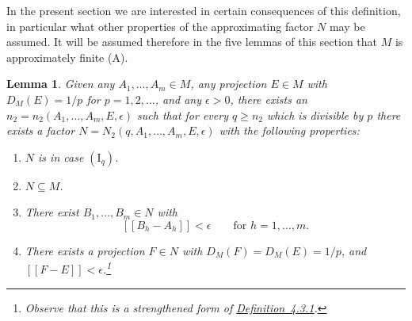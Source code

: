 \documentclass[b5paper,twoside]{article}
\newcommand{\defref}[2]{\hyperref[#1]{\mbox{Definition~#2}}}
\theoremstyle{mvnplain}
\newtheorem{lemma}{Lemma}[section]
\newcommand{\M}{\mathbf M}
\newcommand{\N}{\mathbf N}
\newcommand{\Metric}[1]{\left[\!\left[#1\right]\!\right]}
\def\M{M}%
\def\N{N}%
\def\Metric#1{[[#1]]}%
\begin{document}
In the present section we are interested in certain consequences of this
definition, in particular what other properties of the approximating factor
\(\N\) may be assumed. It will be assumed therefore in the five lemmas of
this section that \(\M\) is approximately finite (A).

\begin{lemma}\label{lem:4.3.1}
Given any \(A_1,\ldots,A_m\in\M\), any projection \(E\in\M\) with
\(D_{\M}(E)=1/p\) for \(p=1,2,\ldots\), and any \(\epsilon>0\), there
exists an \(n_2=n_2(A_1,\ldots,A_m,E,\epsilon)\) such that for every
\(q\ge n_2\) which is divisible by \(p\) there exists a factor
\(\N=\N_2(q,A_1,\ldots,A_m,E,\epsilon)\) with the following properties:
\begin{enumerate}[label=\((\roman*)\)]
\item \(\N\) is in case \((\mathrm I_q)\).
\item \(\N\subseteq\M\).
\item There exist \(B_1,\ldots,B_m\in\N\) with
\[
  \Metric{B_h-A_h}<\epsilon\qquad\text{for }h=1,\ldots,m.
\]
\item There exists a projection \(F\in\N\) with
\(D_{\M}(F)=D_{\M}(E)=1/p\), and
\(\Metric{F-E}<\epsilon\).\footnote{\hypertarget{fn:33}{}Observe that this is a
strengthened form of \defref{def:4.3.1}{4.3.1}.}
\end{enumerate}
\end{lemma}
\end{document}
